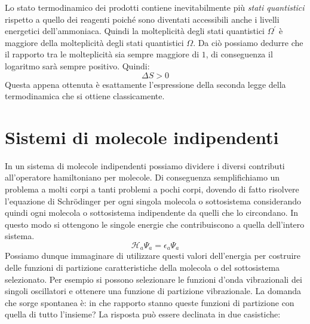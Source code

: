 \documentclass[oneside]{amsbook}
\numberwithin{section}{chapter}
\numberwithin{equation}{section}
\numberwithin{figure}{section}
\begin{document}
Lo stato termodinamico dei prodotti contiene inevitabilmente più \emph{stati quantistici} rispetto a quello dei reagenti poiché  sono diventati accessibili anche i livelli energetici dell'ammoniaca. Quindi la molteplicità degli stati quantistici  $\Omega^\prime$ è maggiore della molteplicità degli stati quantistici $\Omega$. Da ciò possiamo dedurre che il rapporto tra le molteplicità sia sempre maggiore di $1$, di conseguenza il logaritmo sarà sempre positivo. Quindi:
\begin{equation}
\Delta S> 0
\end{equation}
Questa appena ottenuta è esattamente l'espressione della seconda legge della termodinamica che si ottiene classicamente.
\section{Sistemi di molecole indipendenti}
In un sistema di molecole indipendenti possiamo dividere i diversi contributi all'operatore hamiltoniano per molecole. Di conseguenza semplifichiamo un problema a molti corpi a tanti problemi a pochi corpi, dovendo di fatto risolvere l'equazione di  Schr\"{o}dinger per ogni singola molecola o sottosistema considerando quindi ogni molecola o sottosistema indipendente da quelli che lo circondano.
In questo modo si ottengono le singole energie che contribuiscono a quella dell'intero sistema.
\begin{equation}
\mathcal{H}_a\Psi_a=\epsilon_a\Psi_a
\end{equation}
Possiamo dunque immaginare di utilizzare questi valori dell'energia per costruire delle funzioni di partizione caratteristiche della molecola o del sottosistema selezionato. Per esempio si possono selezionare le funzioni d'onda vibrazionali dei singoli oscillatori e ottenere una funzione di partizione vibrazionale.
La domanda che sorge spontanea è: in che rapporto stanno queste funzioni di partizione con quella di tutto l'insieme?
La risposta può essere declinata in due casistiche:
\end{document}
